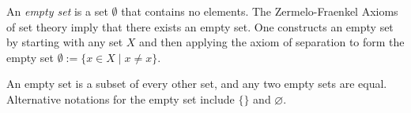 \documentclass[12pt]{article}
\begin{document}
An {\em empty set} is a set $\emptyset$ that contains no elements. The Zermelo-Fraenkel Axioms of set theory imply that there exists an empty set. One constructs an empty set by starting with any set $X$ and then applying the axiom of separation to form the empty set $\emptyset := \{ x \in X \mid x \neq x\}$.

An empty set is a subset of every other set, and any two empty sets are equal. Alternative notations for the empty set include $\{\}$ and $\varnothing$.
\end{document}
